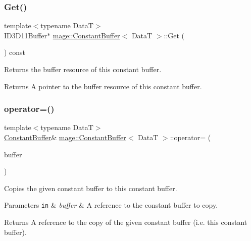 \subsubsection{\texorpdfstring{Get()}{Get()}}
{\footnotesize\ttfamily template$<$typename DataT$>$ \\
I\+D3\+D11\+Buffer$\ast$ \hyperlink{classmage_1_1_constant_buffer}{mage\+::\+Constant\+Buffer}$<$ DataT $>$\+::Get (\begin{DoxyParamCaption}{ }\end{DoxyParamCaption}) const\hspace{0.3cm}{\ttfamily [noexcept]}}

Returns the buffer resource of this constant buffer.

\begin{DoxyReturn}{Returns}
A pointer to the buffer resource of this constant buffer. 
\end{DoxyReturn}
\hypertarget{classmage_1_1_constant_buffer_acb1a4f4b656073609075b5e89dea6973}{}\label{classmage_1_1_constant_buffer_acb1a4f4b656073609075b5e89dea6973} 
\subsubsection{\texorpdfstring{operator=()}{operator=()}\hspace{0.1cm}{\footnotesize\ttfamily [1/2]}}
{\footnotesize\ttfamily template$<$typename DataT$>$ \\
\hyperlink{classmage_1_1_constant_buffer}{Constant\+Buffer}\& \hyperlink{classmage_1_1_constant_buffer}{mage\+::\+Constant\+Buffer}$<$ DataT $>$\+::operator= (\begin{DoxyParamCaption}\item[{const \hyperlink{classmage_1_1_constant_buffer}{Constant\+Buffer}$<$ DataT $>$ \&}]{buffer }\end{DoxyParamCaption})\hspace{0.3cm}{\ttfamily [delete]}}

Copies the given constant buffer to this constant buffer.


\begin{DoxyParams}[1]{Parameters}
\mbox{\tt in}  & {\em buffer} & A reference to the constant buffer to copy. \\
\hline
\end{DoxyParams}
\begin{DoxyReturn}{Returns}
A reference to the copy of the given constant buffer (i.\+e. this constant buffer). 
\end{DoxyReturn}
\hypertarget{classmage_1_1_constant_buffer_ad050b1f0f03a5fcd2b51977a744781a3}{}\label{classmage_1_1_constant_buffer_ad050b1f0f03a5fcd2b51977a744781a3} 
